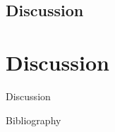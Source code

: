 \documentclass{beamer}
\begin{document}
\subsection{Discussion} %
\label{sub:discussion}
\section{Discussion} %
\label{sec:discussion}

\begin{frame}{Discussion}



\end{frame}
\begin{frame}{Bibliography}
	\newpage
	 \newpage
\end{frame}
\end{document}

